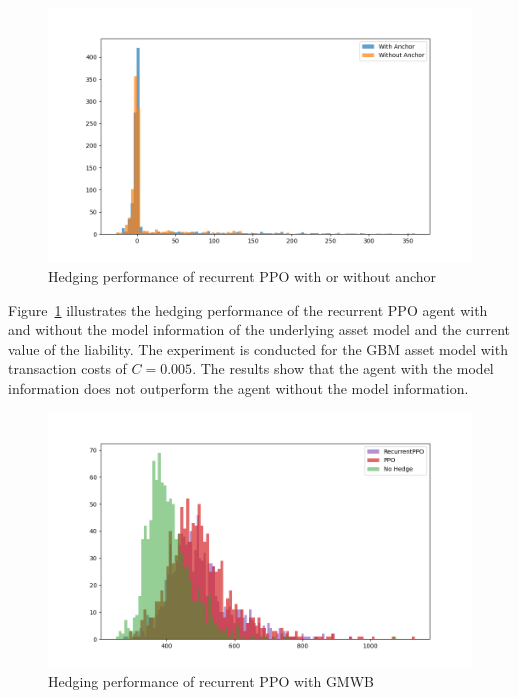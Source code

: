 \begin{figure}[ht!]
    \centering
    \includegraphics[width=\textwidth]{./futureWork/figures/PPO_anchor.png}
    \caption{Hedging performance of recurrent PPO with or without anchor}
    \label{fig3:ppo_anchor}
\end{figure}

Figure~\ref{fig3:ppo_anchor} illustrates the hedging performance of the recurrent PPO agent with and without the model information of the underlying asset model and the current value of the liability.
The experiment is conducted for the GBM asset model with transaction costs of $C=0.005$.
The results show that the agent with the model information does not outperform the agent without the model information.


\begin{figure}[ht!]
    \centering
    \includegraphics[width=\textwidth]{./futureWork/figures/PPO_GMWB.png}
    \caption{Hedging performance of recurrent PPO with GMWB}
    \label{fig3:ppo_GMWB}
\end{figure}

